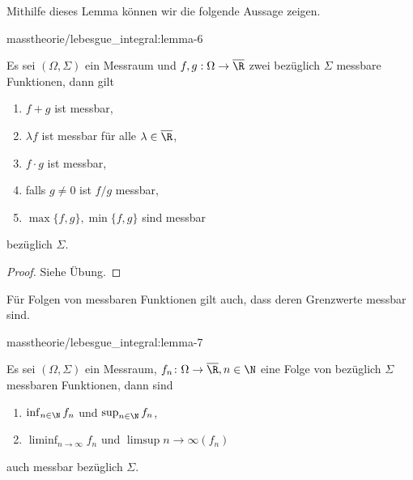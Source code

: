 \documentclass[letterpaper,10pt,german]{jupyterBook}
\begin{document}
\par
Mithilfe dieses Lemma können wir die folgende Aussage zeigen.
\begin{lemma}{}{masstheorie/lebesgue_integral:lemma-6}



\par
Es sei \((\Omega,\Sigma)\) ein Messraum und \(f,g:\Omega\to\overline{\R}\) zwei bezüglich \(\Sigma\) messbare Funktionen, dann gilt
\begin{enumerate}

\item {} 
\par
\(f+g\) ist messbar,

\item {} 
\par
\(\lambda f\) ist messbar für alle \(\lambda\in\overline{\R}\),

\item {} 
\par
\(f\cdot g\) ist messbar,

\item {} 
\par
falls \(g\neq 0\) ist \(f/g\) messbar,

\item {} 
\par
\(\max\{f,g\}, \min\{f,g\}\) sind messbar

\end{enumerate}

\par
bezüglich \(\Sigma\).
\end{lemma}

\begin{proof}
 Siehe Übung.
\end{proof}

\par
Für Folgen von messbaren Funktionen gilt auch, dass deren Grenzwerte messbar sind.
\begin{lemma}{}{masstheorie/lebesgue_integral:lemma-7}



\par
Es sei \((\Omega,\Sigma)\) ein Messraum, \(f_n \colon \Omega\to\overline{\R},n\in\N\) eine Folge von bezüglich \(\Sigma\) messbaren Funktionen, dann sind
\begin{enumerate}

\item {} 
\par
\(\inf_{n\in\N} f_n\) und \(\sup_{n\in\N} f_n\),

\item {} 
\par
\(\liminf_{n\to\infty} f_n\) und \(\limsup{n\to\infty} (f_n)\)

\end{enumerate}

\par
auch messbar bezüglich \(\Sigma\).
\end{lemma}
\end{document}
